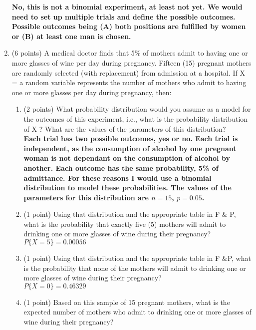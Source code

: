 \documentclass{article}
\begin{document}
\begin{enumerate}
\textbf{No, this is not a binomial experiment, at least not yet. We would need to set up multiple trials and define the possible outcomes. Possible outcomes being (A) both positions are fulfilled by women or (B) at least one man is chosen. } \\
	

\item (6 points) A medical doctor finds that 5\% of mothers admit to having one or more glasses of wine per day during pregnancy. Fifteen (15) pregnant mothers are randomly selected (with replacement) from admission at a hospital. If X = a random variable represents the number of mothers who admit to having one or more glasses per day during pregnancy, then:

	\begin{enumerate}
	\item (2 points) What probability distribution would you assume as a model for the outcomes of this experiment, i.e., what is the probability distribution of X ? What are the values of the parameters of this distribution? \\
	
	\textbf{Each trial has two possible outcomes, yes or no. Each trial is independent, as the consumption of alcohol by one pregnant woman is not dependant on the consumption of alcohol by another. Each outcome has the same probability, 5\% of admittance. For these reasons I would use a binomial distribution to model these probabilities. The values of the parameters for this distribution are $n = 15$, $p = 0.05$.} \\
	
	\item (1 point) Using that distribution and the appropriate table in F \& P, what is the probability that exactly five (5) mothers will admit to drinking one or more glasses of wine during their pregnancy? \\
	
	\textbf{$P\{X=5\} = 0.00056$} \\
	
	\item (1 point) Using that distribution and the appropriate table in F \&P, what is the probability that none of the mothers will admit to drinking one or more glasses of wine during their pregnancy?\\
	
	\textbf{$P\{X=0\} = 0.46329$} \\
	
	\item (1 point) Based on this sample of 15 pregnant mothers, what is the expected number of mothers who admit to drinking one or more glasses of wine during their pregnancy?\\
	

\end{enumerate}
\end{enumerate}
\end{document}
